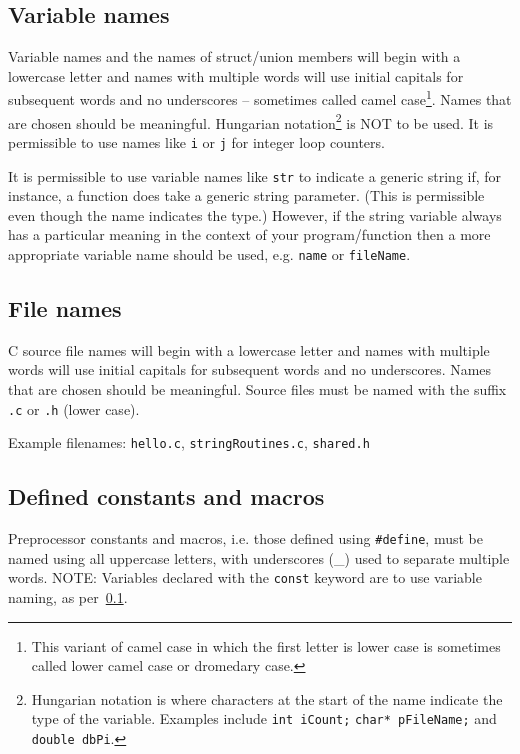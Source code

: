 \documentclass{article}
\begin{document}
\subsection{Variable names}
\label{sec:naming-variable}
Variable names and the names of struct/union members will begin with a lowercase letter and names with multiple words 
will use initial capitals for subsequent words and no underscores -- sometimes called camel case\footnote{This variant of camel case 
in which the first letter is lower case is sometimes called lower camel case or dromedary case.}. 
Names that are chosen should be meaningful. Hungarian notation\footnote{Hungarian notation is where characters at the start of 
the name indicate the type of the variable. Examples include \texttt{int iCount;} \texttt{char* pFileName;} and
\texttt{double dbPi}.}
 is NOT to be used.
It is permissible to use names like \texttt{i} or \texttt{j} for integer loop counters.
\nolinenumbers
{}

\linenumbers


It is permissible to use variable names like \texttt{str} to indicate a generic string if, for instance, a function does take a generic
string parameter. (This is permissible even though the name indicates the type.) However, if the string variable always has a particular meaning in the context of your program/function then a more appropriate variable name should
be used, e.g. \texttt{name} or \texttt{fileName}.

\subsection{File names}
\label{sec:naming-files}
C source file names will begin with a lowercase letter and names with multiple words 
will use initial capitals for subsequent words and no underscores. 
Names that are chosen should be meaningful. Source files must be named with the suffix \texttt{.c} or \texttt{.h} (lower case).

Example filenames: \texttt{hello.c}, \texttt{stringRoutines.c}, \texttt{shared.h}

\subsection{Defined constants and macros}
\label{sec:naming-constants}
Preprocessor constants and macros, i.e. those defined using \texttt{\#define}, must be named 
using all uppercase letters, with underscores (\_) used to separate multiple words.
NOTE: Variables declared with the \texttt{const} keyword are to use variable naming, as 
per~\ref{sec:naming-variable}.
\end{document}

